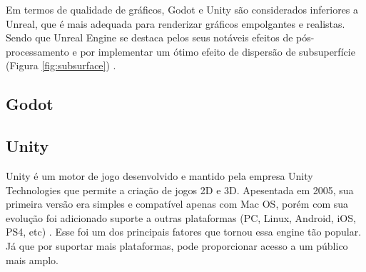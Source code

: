 Em termos de qualidade de gráficos, Godot e Unity são considerados inferiores a Unreal, que é mais adequada para renderizar gráficos empolgantes e realistas. Sendo que Unreal Engine se destaca pelos seus notáveis efeitos de pós-processamento e por implementar um ótimo efeito de dispersão de subsuperfície (Figura \ref{fig:subsurface}) \cite{compStudyGE}.

\begin{figure}[h!]
	\centering
\end{figure}
\nocite{subsurface}

\subsection{Godot}
\label{sec:godot}

\subsection{Unity}
\label{sec:unity}

Unity é um motor de jogo desenvolvido e mantido pela empresa Unity Technologies que permite a criação de jogos 2D e 3D. Apesentada em 2005, sua primeira versão era simples e compatível apenas com Mac OS, porém com sua evolução foi adicionado suporte a outras plataformas (PC, Linux, Android, iOS, PS4, etc) \cite{compStudyGE}. Esse foi um dos principais fatores que tornou essa engine tão popular. Já que por suportar mais plataformas, pode proporcionar acesso a um público mais amplo.

